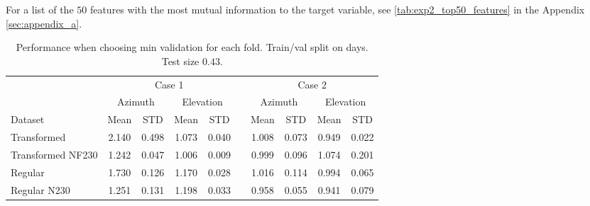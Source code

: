 For a list of the $50$ features with the most mutual information to the target variable, see \ref{tab:exp2_top50_features} in the Appendix \ref{sec:appendix_a}.



\begin{table}[!htbp]
    \centering
    \label{tab:results_minval_days04}
    \caption{Performance when choosing min validation for each fold. Train/val split on days. Test size $0.43$.}
    \begin{tabular}{lcccc c cccc}
        \toprule
        \multicolumn{1}{c}{} & \multicolumn{4}{c}{Case 1} & & \multicolumn{4}{c}{Case 2} \\
        \cmidrule(lr){2-5} \cmidrule(lr){7-10}
        \multicolumn{1}{c}{} & \multicolumn{2}{c}{Azimuth} & \multicolumn{2}{c}{Elevation} & & \multicolumn{2}{c}{Azimuth} & \multicolumn{2}{c}{Elevation} \\ 
        \cmidrule(lr){2-5} \cmidrule(lr){7-10}
        Dataset &  Mean &  STD &  Mean &  STD & & Mean &  STD &  Mean &  STD \\
        \midrule
        Transformed       &     2.140 &     0.498 &     1.073 &     0.040 &  &   1.008 &     0.073 &     0.949 &     0.022 \\
        Transformed NF230 &     1.242 &     0.047 &     1.006 &     0.009 &  &   0.999 &     0.096 &     1.074 &     0.201 \\
        Regular           &     1.730 &     0.126 &     1.170 &     0.028 &  &   1.016 &     0.114 &     0.994 &     0.065 \\
        Regular N230      &     1.251 &     0.131 &     1.198 &     0.033 &  &   0.958 &     0.055 &     0.941 &     0.079 \\
        \bottomrule
    \end{tabular}
\end{table}

